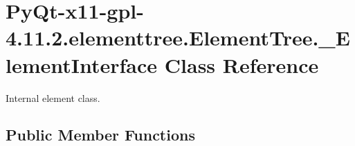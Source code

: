 \hypertarget{classPyQt-x11-gpl-4_811_82_1_1elementtree_1_1ElementTree_1_1__ElementInterface}{}\section{Py\+Qt-\/x11-\/gpl-\/4.11.2.elementtree.\+Element\+Tree.\+\_\+\+Element\+Interface Class Reference}
\label{classPyQt-x11-gpl-4_811_82_1_1elementtree_1_1ElementTree_1_1__ElementInterface}


Internal element class.  


\subsection*{Public Member Functions}
